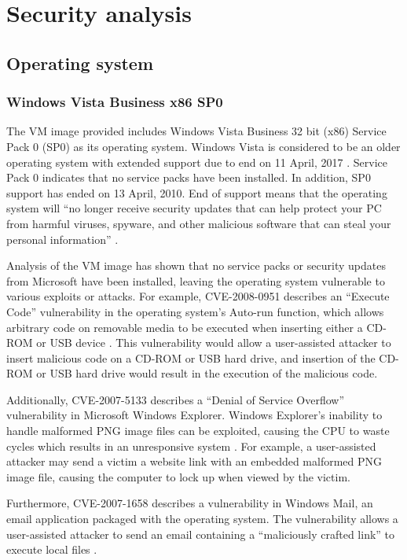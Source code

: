 \section{Security analysis}

\subsection{Operating system}

\subsubsection{Windows Vista Business x86 SP0}

The VM image provided includes Windows Vista Business 32 bit (x86) Service Pack 0 (SP0) as its operating system. Windows Vista is considered to be an older operating system with extended support due to end on 11 April, 2017 \citep{Microsoft2014}. Service Pack 0 indicates that no service packs have been installed. In addition, SP0 support has ended on 13 April, 2010. End of support means that the operating system will ``no longer receive security updates that can help protect your PC from harmful viruses, spyware, and other malicious software that can steal your personal information'' \citep{Microsoft2015}.

Analysis of the VM image has shown that no service packs or security updates from Microsoft have been installed, leaving the operating system vulnerable to various exploits or attacks. For example, CVE-2008-0951 describes an ``Execute Code'' vulnerability in the operating system's Auto-run function, which allows arbitrary code on removable media to be executed when inserting either a CD-ROM or USB device \citep{SecurityFocus2008}. This vulnerability would allow a user-assisted attacker to insert malicious code on a CD-ROM or USB hard drive, and insertion of the CD-ROM or USB hard drive would result in the execution of the malicious code.

Additionally, CVE-2007-5133 describes a ``Denial of Service Overflow'' vulnerability in Microsoft Windows Explorer. Windows Explorer's inability to handle malformed PNG image files can be exploited, causing the CPU to waste cycles which results in an unresponsive system \citep{SecurityFocus2007a}. For example, a user-assisted attacker may send a victim a website link with an embedded malformed PNG image file, causing the computer to lock up when viewed by the victim.

Furthermore, CVE-2007-1658 describes a vulnerability in Windows Mail, an email application packaged with the operating system. The vulnerability allows a user-assisted attacker to send an email containing a ``maliciously crafted link'' to execute local files \citep{SecurityFocus2007b}.

